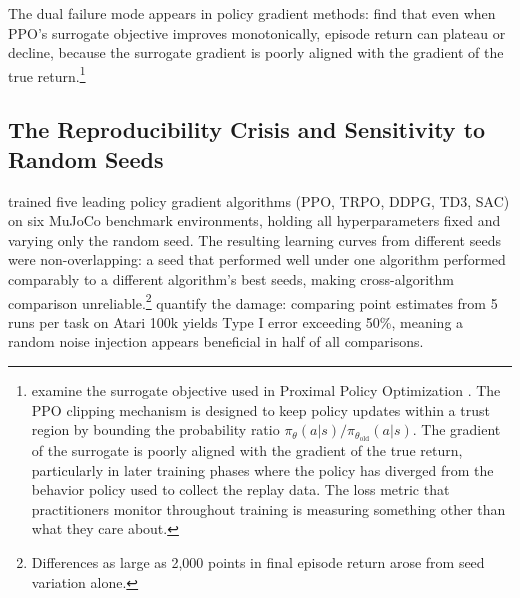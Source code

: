The dual failure mode appears in policy gradient methods: \citet{IlyasFang2020} find that even when PPO's surrogate objective improves monotonically, episode return can plateau or decline, because the surrogate gradient is poorly aligned with the gradient of the true return.\footnote{\citet{IlyasFang2020} examine the surrogate objective used in Proximal Policy Optimization \citep{Schulman2017}. The PPO clipping mechanism is designed to keep policy updates within a trust region by bounding the probability ratio $\pi_\theta(a|s)/\pi_{\theta_{\text{old}}}(a|s)$. The gradient of the surrogate is poorly aligned with the gradient of the true return, particularly in later training phases where the policy has diverged from the behavior policy used to collect the replay data. The loss metric that practitioners monitor throughout training is measuring something other than what they care about.}

\subsection{The Reproducibility Crisis and Sensitivity to Random Seeds}
\label{sec:reproducibility}

\citet{henderson2018deep} trained five leading policy gradient algorithms (PPO, TRPO, DDPG, TD3, SAC) on six MuJoCo benchmark environments, holding all hyperparameters fixed and varying only the random seed. The resulting learning curves from different seeds were non-overlapping: a seed that performed well under one algorithm performed comparably to a different algorithm's best seeds, making cross-algorithm comparison unreliable.\footnote{Differences as large as 2,000 points in final episode return arose from seed variation alone.} \citet{Agarwal2021} quantify the damage: comparing point estimates from 5 runs per task on Atari 100k yields Type I error exceeding 50\%, meaning a random noise injection appears beneficial in half of all comparisons.

